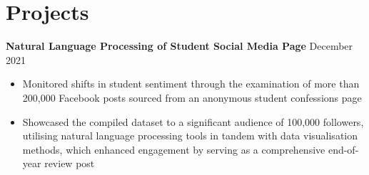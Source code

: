 \documentclass{article}
\begin{document}

\vspace{-0.75\baselineskip}
\hrulefill
\vspace{-0.75\baselineskip}

\section*{Projects}


\textbf{Natural Language Processing of Student Social Media Page} \hfill December 2021
\begin{itemize}
    \item Monitored shifts in student sentiment through the examination of more than 200,000 Facebook posts sourced from an anonymous student confessions page
    \item Showcased the compiled dataset to a significant audience of 100,000 followers, utilising natural language processing tools in tandem with data visualisation methods, which enhanced engagement by serving as a comprehensive end-of-year review post
\end{itemize} \medskip
\end{document}

